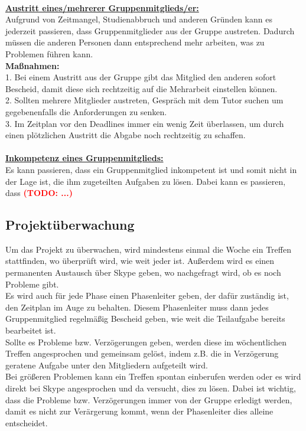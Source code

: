 \documentclass[fontsize=12pt,paper=a4,twoside]{scrartcl}
\newcommand{\todo}[1]{\textbf{\textsc{\textcolor{red}{(TODO: #1)}}}}
\begin{document}
\bigskip \\
\textbf{\underline{Austritt eines/mehrerer Gruppenmitglieds/er:}}\\
Aufgrund von Zeitmangel, Studienabbruch und anderen Gründen kann es jederzeit passieren, dass Gruppenmitglieder aus der Gruppe austreten. Dadurch müssen die anderen Personen dann entsprechend mehr arbeiten, was zu Problemen führen kann.\\
\textbf{Maßnahmen:}\\
1. Bei einem Austritt aus der Gruppe gibt das Mitglied den anderen sofort Bescheid, damit diese sich rechtzeitig auf die Mehrarbeit einstellen können.\\
2. Sollten mehrere Mitglieder austreten, Gespräch mit dem Tutor suchen um gegebenenfalls die Anforderungen zu senken.\\
3. Im Zeitplan vor den Deadlines immer ein wenig Zeit überlassen, um durch einen plötzlichen Austritt die Abgabe noch rechtzeitig zu schaffen.\\
\bigskip \\
\textbf{\underline{Inkompetenz eines Gruppenmitglieds:}}\\
Es kann passieren, dass ein Gruppenmitglied inkompetent ist und somit nicht in der Lage ist, die ihm zugeteilten Aufgaben zu lösen. Dabei kann es passieren, dass \todo{...}

\subsection{Projektüberwachung}\label{3.4-controlling}

Um das Projekt zu überwachen, wird mindestens einmal die Woche ein Treffen stattfinden, wo überprüft wird, wie weit jeder ist. Außerdem wird es einen permanenten Austausch über Skype geben, wo nachgefragt wird, ob es noch Probleme gibt. \\
Es wird auch für jede Phase einen Phasenleiter geben, der dafür zuständig ist, den Zeitplan im Auge zu behalten. Diesem Phasenleiter muss dann jedes Gruppenmitglied regelmäßig Bescheid geben, wie weit die Teilaufgabe bereits bearbeitet ist.\\
Sollte es Probleme bzw. Verzögerungen geben, werden diese im wöchentlichen Treffen angesprochen und gemeinsam gelöst, indem z.B. die in Verzögerung geratene Aufgabe unter den Mitgliedern aufgeteilt wird.\\
Bei größeren Problemen kann ein Treffen spontan einberufen werden oder es wird direkt bei Skype angesprochen und da versucht, dies zu lösen. Dabei ist wichtig, dass die Probleme bzw. Verzögerungen immer von der Gruppe erledigt werden, damit es nicht zur Verärgerung kommt, wenn der Phasenleiter dies alleine entscheidet.
\end{document}
